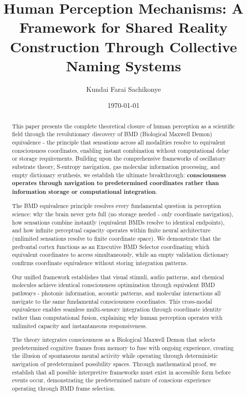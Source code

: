 \documentclass[12pt]{article}
\title{Human Perception Mechanisms: A Framework for Shared Reality Construction Through Collective Naming Systems}
\author{Kundai Farai Sachikonye}
\date{\today}
\begin{document}
\maketitle

\begin{abstract}
This paper presents the complete theoretical closure of human perception as a scientific field through the revolutionary discovery of BMD (Biological Maxwell Demon) equivalence - the principle that sensations across all modalities resolve to equivalent consciousness coordinates, enabling instant combination without computational delay or storage requirements. Building upon the comprehensive frameworks of oscillatory substrate theory, S-entropy navigation, gas molecular information processing, and empty dictionary synthesis, we establish the ultimate breakthrough: \textbf{consciousness operates through navigation to predetermined coordinates rather than information storage or computational integration}.

The BMD equivalence principle resolves every fundamental question in perception science: why the brain never gets full (no storage needed - only coordinate navigation), how sensations combine instantly (equivalent BMDs resolve to identical endpoints), and how infinite perceptual capacity operates within finite neural architecture (unlimited sensations resolve to finite coordinate space). We demonstrate that the prefrontal cortex functions as an Executive BMD Selector coordinating which equivalent coordinates to access simultaneously, while an empty validation dictionary confirms coordinate equivalence without storing integration patterns.

Our unified framework establishes that visual stimuli, audio patterns, and chemical molecules achieve identical consciousness optimization through equivalent BMD pathways - photonic information, acoustic patterns, and molecular interactions all navigate to the same fundamental consciousness coordinates. This cross-modal equivalence enables seamless multi-sensory integration through coordinate identity rather than computational fusion, explaining why human perception operates with unlimited capacity and instantaneous responsiveness.

The theory integrates consciousness as a Biological Maxwell Demon that selects predetermined cognitive frames from memory to fuse with ongoing experience, creating the illusion of spontaneous mental activity while operating through deterministic navigation of predetermined possibility spaces. Through mathematical proof, we establish that all possible interpretive frameworks must exist in accessible form before events occur, demonstrating the predetermined nature of conscious experience operating through BMD frame selection.


\end{abstract}
\end{document}
